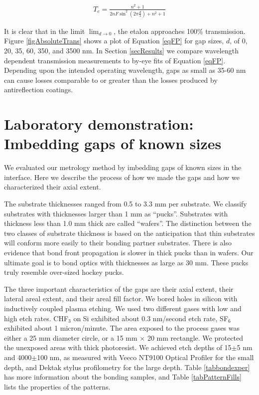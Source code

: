 \documentclass[osajnl,preprint,showpacs,superscriptaddress,12pt]{revtex4-1} %
\begin{document}
\begin{eqnarray}
T_{e} = \frac{n^2+1}{2 n F \sin ^2(2\pi \frac{d}{\lambda})+n^2+1} \label{eqFP}
\end{eqnarray}

It is clear that in the limit $\lim_{d \rightarrow 0}$, the etalon approaches 100\% transmission.  Figure \ref{figAbsoluteTrans} shows a plot of Equation \ref{eqFP} for gap sizes, $d$, of 0, 20, 35, 60, 350, and 3500 nm.  In Section \ref{secResults} we compare wavelength dependent transmission measurements to by-eye fits of Equation \ref{eqFP}.  Depending upon the intended operating wavelength, gaps as small as 35-60 nm can cause losses comparable to or greater than the losses produced by antireflection coatings.

\section{Laboratory demonstration: Imbedding gaps of known sizes}

We evaluated our metrology method by imbedding gaps of known sizes in the interface.  Here we describe the process of how we made the gaps and how we characterized their axial extent.  

The substrate thicknesses ranged from 0.5 to 3.3 mm per substrate.  We classify substrates with thicknesses larger than 1 mm as ``pucks''.  Substrates with thickness less than 1.0 mm thick are called ``wafers''.  The distinction between the two classes of substrate thickness is based on the anticipation that thin substrates will conform more easily to their bonding partner substrates.  There is also evidence that bond front propagation is slower in thick pucks \cite{2007ApOpt..46.6793H} than in wafers.  Our ultimate goal is to bond optics with thicknesses as large as 30 mm.  These pucks truly resemble over-sized hockey pucks.  

The three important characteristics of the gaps are their axial extent, their lateral areal extent, and their areal fill factor.  We bored holes in silicon with inductively coupled plasma etching.  We used two different gases with low and high etch rates.  CHF$_3$ on Si exhibited about 0.3 nm/second etch rate, SF$_6$ exhibited about 1 micron/minute.  The area exposed to the process gases was either a 25 mm diameter circle, or a 15 mm $\times$ 20 mm rectangle.  We protected the unexposed areas with thick photoresist.  We achieved etch depths of 15$\pm$5 nm and 4000$\pm$100 nm, as measured with Veeco NT9100 Optical Profiler for the small depth, and Dektak stylus profilometry for the large depth.  Table \ref{tabbondexper} has more information about the bonding samples, and Table \ref{tabPatternFills} lists the properties of the patterns.
\end{document}
